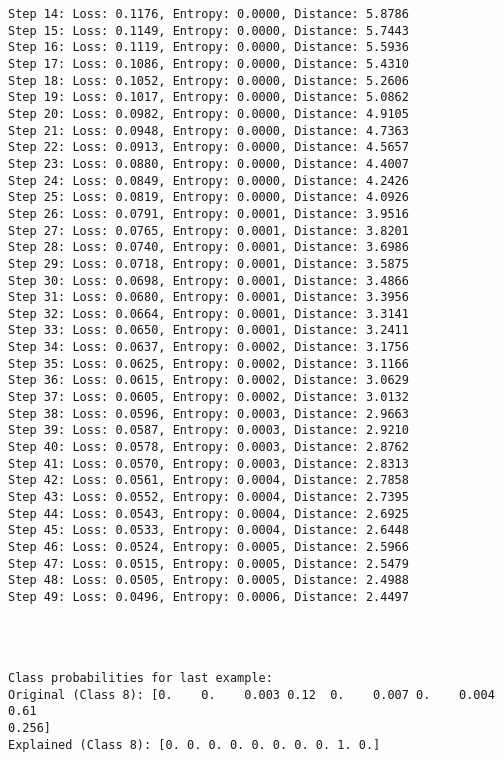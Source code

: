 \documentclass[11pt]{article}
\begin{document}
\begin{Verbatim}[commandchars=\\\{\}]
Step 14: Loss: 0.1176, Entropy: 0.0000, Distance: 5.8786
Step 15: Loss: 0.1149, Entropy: 0.0000, Distance: 5.7443
Step 16: Loss: 0.1119, Entropy: 0.0000, Distance: 5.5936
Step 17: Loss: 0.1086, Entropy: 0.0000, Distance: 5.4310
Step 18: Loss: 0.1052, Entropy: 0.0000, Distance: 5.2606
Step 19: Loss: 0.1017, Entropy: 0.0000, Distance: 5.0862
Step 20: Loss: 0.0982, Entropy: 0.0000, Distance: 4.9105
Step 21: Loss: 0.0948, Entropy: 0.0000, Distance: 4.7363
Step 22: Loss: 0.0913, Entropy: 0.0000, Distance: 4.5657
Step 23: Loss: 0.0880, Entropy: 0.0000, Distance: 4.4007
Step 24: Loss: 0.0849, Entropy: 0.0000, Distance: 4.2426
Step 25: Loss: 0.0819, Entropy: 0.0000, Distance: 4.0926
Step 26: Loss: 0.0791, Entropy: 0.0001, Distance: 3.9516
Step 27: Loss: 0.0765, Entropy: 0.0001, Distance: 3.8201
Step 28: Loss: 0.0740, Entropy: 0.0001, Distance: 3.6986
Step 29: Loss: 0.0718, Entropy: 0.0001, Distance: 3.5875
Step 30: Loss: 0.0698, Entropy: 0.0001, Distance: 3.4866
Step 31: Loss: 0.0680, Entropy: 0.0001, Distance: 3.3956
Step 32: Loss: 0.0664, Entropy: 0.0001, Distance: 3.3141
Step 33: Loss: 0.0650, Entropy: 0.0001, Distance: 3.2411
Step 34: Loss: 0.0637, Entropy: 0.0002, Distance: 3.1756
Step 35: Loss: 0.0625, Entropy: 0.0002, Distance: 3.1166
Step 36: Loss: 0.0615, Entropy: 0.0002, Distance: 3.0629
Step 37: Loss: 0.0605, Entropy: 0.0002, Distance: 3.0132
Step 38: Loss: 0.0596, Entropy: 0.0003, Distance: 2.9663
Step 39: Loss: 0.0587, Entropy: 0.0003, Distance: 2.9210
Step 40: Loss: 0.0578, Entropy: 0.0003, Distance: 2.8762
Step 41: Loss: 0.0570, Entropy: 0.0003, Distance: 2.8313
Step 42: Loss: 0.0561, Entropy: 0.0004, Distance: 2.7858
Step 43: Loss: 0.0552, Entropy: 0.0004, Distance: 2.7395
Step 44: Loss: 0.0543, Entropy: 0.0004, Distance: 2.6925
Step 45: Loss: 0.0533, Entropy: 0.0004, Distance: 2.6448
Step 46: Loss: 0.0524, Entropy: 0.0005, Distance: 2.5966
Step 47: Loss: 0.0515, Entropy: 0.0005, Distance: 2.5479
Step 48: Loss: 0.0505, Entropy: 0.0005, Distance: 2.4988
Step 49: Loss: 0.0496, Entropy: 0.0006, Distance: 2.4497
    \end{Verbatim}

    \begin{center}
    \end{center}
    { \hspace*{\fill} \\}
    
    \begin{Verbatim}[commandchars=\\\{\}]

Class probabilities for last example:
Original (Class 8): [0.    0.    0.003 0.12  0.    0.007 0.    0.004 0.61
0.256]
Explained (Class 8): [0. 0. 0. 0. 0. 0. 0. 0. 1. 0.]
    \end{Verbatim}


    
    
    
\end{document}
